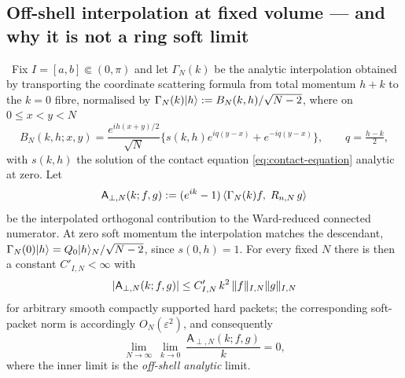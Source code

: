 \subsection{Off-shell interpolation at fixed volume --- and why it is not a ring soft limit}

\begin{theorem}
\label{thm:ml4-offshell}
\statusSketch\ Fix $I=[a,b]\Subset(0,\pi)$ and let $\Gamma_N(k)$ be the
analytic interpolation obtained by transporting the coordinate scattering
formula from total momentum $h+k$ to the $k=0$ fibre, normalised by
$\Gamma_N(k)|h\rangle:=B_N(k,h)/\sqrt{N-2}$, where on $0\le x<y<N$
\begin{equation}
  B_N(k,h;x,y)=\frac{e^{ih(x+y)/2}}{\sqrt N}
    \bigl\{s(k,h)e^{iq(y-x)}+e^{-iq(y-x)}\bigr\},
  \qquad q=\tfrac{h-k}{2},
\end{equation}
with $s(k,h)$ the solution of the contact equation \cref{eq:contact-equation}
analytic at zero. Let
\begin{equation}
  \mathsf{A}_{\perp,N}(k;f,g):=(e^{ik}-1)\,
   \langle \Gamma_N(k)f,\;R_{n,N}\,g\rangle
\end{equation}
be the interpolated orthogonal contribution to the Ward-reduced connected
numerator. At zero soft momentum the interpolation matches the descendant,
$\Gamma_N(0)|h\rangle=Q_0|h\rangle_N/\sqrt{N-2}$, since $s(0,h)=1$. For every
fixed $N$ there is then a constant $C'_{I,N}<\infty$ with
\begin{equation}
  \lvert \mathsf{A}_{\perp,N}(k;f,g)\rvert
   \le C'_{I,N}\,k^2\,\lVert f\rVert_{I,N}\lVert g\rVert_{I,N}
\end{equation}
for arbitrary smooth compactly supported hard packets; the corresponding
soft-packet norm is accordingly $O_N(\varepsilon^2)$, and consequently
\begin{equation}
  \lim_{N\to\infty}\ \lim_{k\to0}\
   \frac{\mathsf{A}_{\perp,N}(k;f,g)}{k}=0 ,
\end{equation}
where the inner limit is the \emph{off-shell analytic} limit.
\end{theorem}
